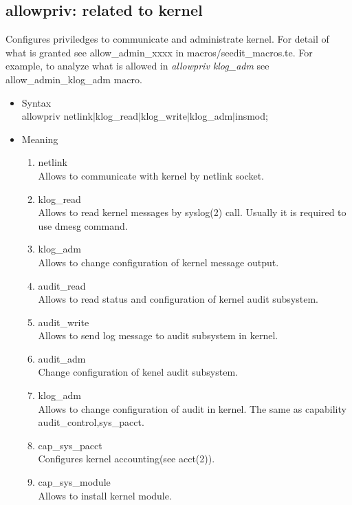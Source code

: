 \documentclass{article}
\begin{document}
\subsection{allowpriv: related to kernel}
Configures priviledges to communicate and administrate kernel. For detail of what is granted see allow\_admin\_xxxx in
       macros/seedit\_macros.te. For example, to analyze what is allowed
       in {\it allowpriv klog\_adm} see allow\_admin\_klog\_adm macro.
\begin{itemize}
 \item Syntax\\
       allowpriv netlink$\mid$klog\_read$\mid$klog\_write$\mid$klog\_adm$\mid$insmod;
 \item Meaning\\
       \begin{enumerate}
	\item netlink\\
	      Allows to communicate with kernel by netlink socket. 
	\item klog\_read\\
	      Allows to read kernel messages by syslog(2) call. Usually
	      it is required to use dmesg command.
	\item klog\_adm\\
	      Allows to change configuration of kernel message output.
	\item audit\_read\\
	      Allows to read status and configuration of kernel audit
           subsystem.
	\item audit\_write\\
	      Allows to send log message to audit subsystem in
	      kernel.
	\item audit\_adm\\
	      Change configuration of kenel audit subsystem.
	\item klog\_adm\\
	      Allows to change configuration of audit in kernel. The
	      same as capability audit\_control,sys\_pacct.
	\item cap\_sys\_pacct\\
	      Configures kernel accounting(see acct(2)).
	\item cap\_sys\_module\\
	      Allows to install kernel module.
       
       \end{enumerate}
\end{itemize}
\end{document}
